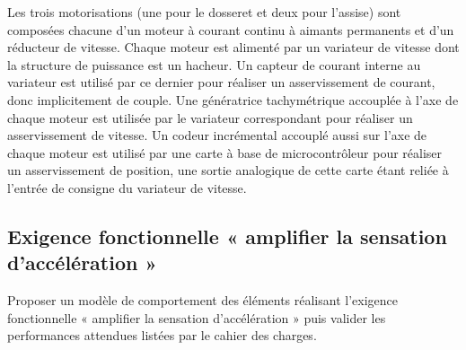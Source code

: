\begin{multicols}{2}
Les trois motorisations (une pour le dosseret et deux pour l'assise)
sont composées chacune d'un moteur à courant continu à aimants
permanents et d'un réducteur de vitesse. Chaque moteur est alimenté par
un variateur de vitesse dont la structure de puissance est un hacheur.
Un capteur de courant interne au variateur est utilisé par ce dernier pour réaliser un asservissement de courant, donc implicitement de couple. Une génératrice tachymétrique accouplée
à l'axe de chaque moteur est utilisée par le variateur correspondant
pour réaliser un asservissement de vitesse. Un codeur incrémental
accouplé aussi sur l'axe de chaque moteur est utilisé par une carte à
base de microcontrôleur pour réaliser un asservissement de position, une
sortie analogique de cette carte étant reliée à l'entrée de consigne du
variateur de vitesse.
\fi
%
%
%


\subsection*{Exigence fonctionnelle « amplifier la sensation
d'accélération »}
\ifprof
\else

\begin{obj}
Proposer un modèle de comportement des éléments réalisant l'exigence
fonctionnelle « amplifier la sensation d'accélération » puis valider les
performances attendues listées par le cahier des charges.
\end{obj}


\end{multicols}
